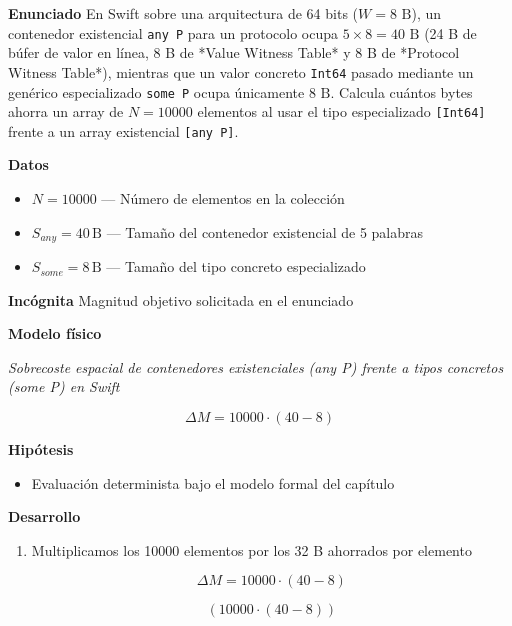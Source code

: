 \documentclass{book}
\begin{document}
\begin{tcolorbox}[title={Problema resuelto}, studiumworked, breakable]

\noindent\textbf{Enunciado}
En Swift sobre una arquitectura de 64 bits (\(W = 8\text{ B}\)), un contenedor existencial \texttt{any P} para un protocolo ocupa \(5 \times 8 = 40\text{ B}\) (24 B de búfer de valor en línea, 8 B de *Value Witness Table* y 8 B de *Protocol Witness Table*), mientras que un valor concreto \texttt{Int64} pasado mediante un genérico especializado \texttt{some P} ocupa únicamente \(8\text{ B}\). Calcula cuántos bytes ahorra un array de \(N = 10000\) elementos al usar el tipo especializado \texttt{[Int64]} frente a un array existencial \texttt{[any P]}.

\noindent\textbf{Datos}
\begin{itemize}
\item $N = 10000$ — Número de elementos en la colección
\item $S_{any} = 40\,\mathrm{B}$ — Tamaño del contenedor existencial de 5 palabras
\item $S_{some} = 8\,\mathrm{B}$ — Tamaño del tipo concreto especializado
\end{itemize}

\noindent\textbf{Incógnita}
Magnitud objetivo solicitada en el enunciado

\noindent\textbf{Modelo físico}

\noindent\textit{Sobrecoste espacial de contenedores existenciales (any P) frente a tipos concretos (some P) en Swift}

\[
\Delta M = 10000 \cdot (40 - 8)
\]

\noindent\textbf{Hipótesis}
\begin{itemize}
\item Evaluación determinista bajo el modelo formal del capítulo
\end{itemize}

\noindent\textbf{Desarrollo}
\begin{enumerate}
\item
Multiplicamos los 10000 elementos por los 32 B ahorrados por elemento

\[
\Delta M = 10000 \cdot (40 - 8)
\]

\[
\left(10000\cdot \left(40-8\right)\right)
\]
\end{enumerate}


\end{tcolorbox}
\end{document}
